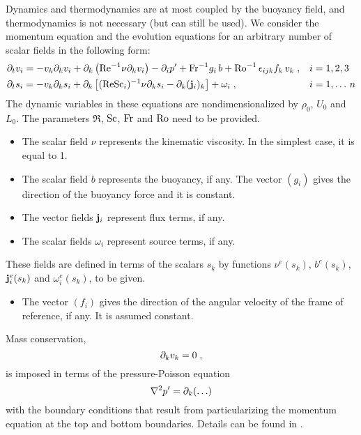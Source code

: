 Dynamics and thermodynamics are at most coupled by the buoyancy field, and thermodynamics is not necessary (but can still be used). We consider the momentum equation and the evolution equations for an arbitrary number of scalar fields in the following form:
\begin{subequations}
    \begin{align}
        &\partial_t v_i = -v_k\partial_k v_i + \partial_k\left(\mathrm{Re}^{-1} \nu \partial_k v_i\right) -\partial_i p'
        +\mathrm{Fr}^{-1} g_i\,b +\mathrm{Ro}^{-1}\,\epsilon_{ijk} f_k\,v_k\;, &&i =1,2,3 \\
        &\partial_t s_i  = -v_k\partial_k s_i +\partial_k \left[(\mathrm{Re}\mathrm{Sc}_i)^{-1} \nu \partial_k s_i -\partial_k (\mathbf{j}_i)_k\right] + \omega_i \;, &&i = 1,\ldots\,n
    \end{align}
\end{subequations}
The dynamic variables in these equations are  nondimensionalized by $\rho_0$, $U_0$ and $L_0$. The parameters $\Re$, $\mathrm{Sc}$, $\mathrm{Fr}$ and $\mathrm{Ro}$ need to be provided.
\begin{itemize}
    \item The scalar field $\nu$ represents the kinematic viscosity. In the simplest case, it is equal to 1.
    \item The scalar field $b$ represents the buoyancy, if any. The vector $(g_i)$ gives the direction of the buoyancy force and it is constant.
    \item The vector fields $\mathbf{j}_i$ represent flux terms, if any.
    \item The scalar fields $\omega_i$ represent source terms, if any.
\end{itemize}
These fields are defined in terms of the scalars $s_k$ by functions $\nu^e(s_k)$, $b^e(s_k)$, $\mathbf{j}^e_i(s_k)$ and $\omega^e_i(s_k)$, to be given.
\begin{itemize}
    \item The vector $(f_i)$ gives the direction of the angular velocity of the frame of reference, if any. It is assumed constant.
\end{itemize}
Mass conservation,
\begin{equation}
    \partial_k v_k=0\;,
\end{equation}
is imposed in terms of the pressure-Poisson equation
\begin{equation}
    \nabla^2 p'=\partial_k(\ldots)
\end{equation}
with the boundary conditions that result from particularizing the momentum equation at the top and bottom boundaries. Details can be found in \cite{mellado2012factorization}.

